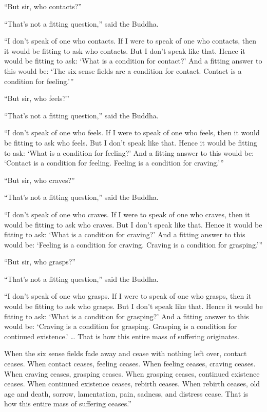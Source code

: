 \documentclass[12pt,openany]{book}%
\begin{document}
“But sir, who contacts?” 

“That’s not a fitting question,” said the Buddha. 

“I don’t speak of one who contacts. If I were to speak of one who contacts, then it would be fitting to ask who contacts. But I don’t speak like that. Hence it would be fitting to ask: ‘What is a condition for contact?’ And a fitting answer to this would be: ‘The six sense fields are a condition for contact. Contact is a condition for feeling.’” 

“But sir, who feels?” 

“That’s not a fitting question,” said the Buddha. 

“I don’t speak of one who feels. If I were to speak of one who feels, then it would be fitting to ask who feels. But I don’t speak like that. Hence it would be fitting to ask: ‘What is a condition for feeling?’ And a fitting answer to this would be: ‘Contact is a condition for feeling. Feeling is a condition for craving.’” 

“But sir, who craves?” 

“That’s not a fitting question,” said the Buddha. 

“I don’t speak of one who craves. If I were to speak of one who craves, then it would be fitting to ask who craves. But I don’t speak like that. Hence it would be fitting to ask: ‘What is a condition for craving?’ And a fitting answer to this would be: ‘Feeling is a condition for craving. Craving is a condition for grasping.’” 

“But sir, who grasps?” 

“That’s not a fitting question,” said the Buddha. 

“I don’t speak of one who grasps. If I were to speak of one who grasps, then it would be fitting to ask who grasps. But I don’t speak like that. Hence it would be fitting to ask: ‘What is a condition for grasping?’ And a fitting answer to this would be: ‘Craving is a condition for grasping. Grasping is a condition for continued existence.’ … That is how this entire mass of suffering originates. 

When the six sense fields fade away and cease with nothing left over, contact ceases. When contact ceases, feeling ceases. When feeling ceases, craving ceases. When craving ceases, grasping ceases. When grasping ceases, continued existence ceases. When continued existence ceases, rebirth ceases. When rebirth ceases, old age and death, sorrow, lamentation, pain, sadness, and distress cease. That is how this entire mass of suffering ceases.” 
\end{document}
